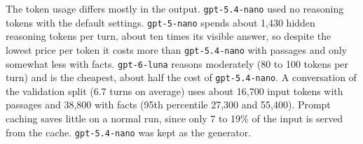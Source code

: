 The token usage differs mostly in the output. \texttt{gpt-5.4-nano} used no reasoning
tokens with the default settings. \texttt{gpt-5-nano} spends about 1{,}430 hidden reasoning
tokens per turn, about ten times its visible answer, so despite the lowest price per token
it costs more than \texttt{gpt-5.4-nano} with passages and only somewhat less with facts.
\texttt{gpt-6-luna} reasons moderately (80 to 100 tokens per turn) and is the cheapest,
about half the cost of \texttt{gpt-5.4-nano}. A conversation of the validation split (6.7
turns on average) uses about 16{,}700 input tokens with passages and 38{,}800 with facts
(95th percentile 27{,}300 and 55{,}400). Prompt caching saves little on a normal run, since
only 7 to 19\% of the input is served from the cache. \texttt{gpt-5.4-nano} was kept as the
generator.
